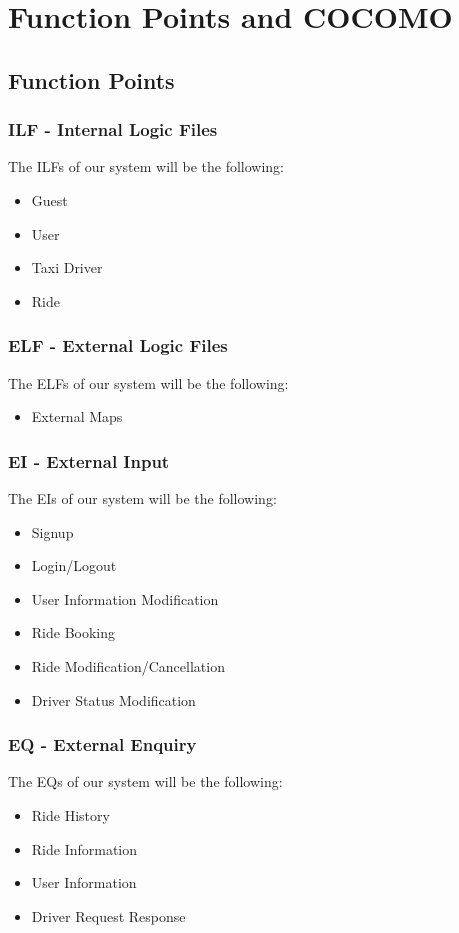 \section{Function Points and COCOMO}

\subsection{Function Points}
	\subsubsection{ILF - Internal Logic Files}
		The ILFs of our system will be the following:
		\begin{itemize}
			\item Guest
			\item User
			\item Taxi Driver
			\item Ride
		\end{itemize}
	\subsubsection{ELF - External Logic Files}
		The ELFs of our system will be the following:
		\begin{itemize}
			\item External Maps
		\end{itemize}
	\subsubsection{EI - External Input}
		The EIs of our system will be the following:
		\begin{itemize}
			\item Signup
			\item Login/Logout
			\item User Information Modification
			\item Ride Booking
			\item Ride Modification/Cancellation
			\item Driver Status Modification
		\end{itemize}
	\subsubsection{EQ - External Enquiry}
		The EQs of our system will be the following:
		\begin{itemize}
			\item Ride History
			\item Ride Information
			\item User Information
			\item Driver Request Response
		\end{itemize}
